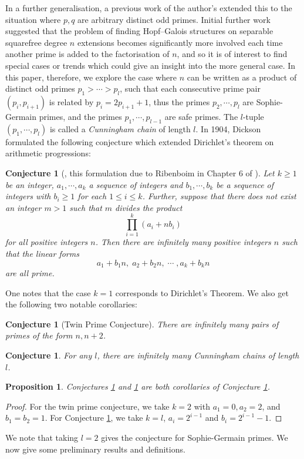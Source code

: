 \documentclass[a4paper,reqno]{amsart}
\newtheorem{proposition}[theorem]{Proposition}
\newtheorem{conjecture}[theorem]{Conjecture}
\theoremstyle{definition}
\begin{document}
In a further generalisation, a previous work of the author's \cite{Dar24(a)} extended this to the situation where $p,q$ are arbitrary distinct odd primes. Initial further work suggested that the problem of finding Hopf--Galois structures on separable squarefree degree $n$ extensions becomes significantly more involved each time another prime is added to the factorisation of $n$, and so it is of interest to find special cases or trends which could give an insight into the more general case. In this paper, therefore, we explore the case where $n$ can be written as a product of distinct odd primes $p_1>\cdots>p_l$, such that each consecutive prime pair $(p_i,p_{i+1})$ is related by $p_i=2p_{i+1}+1$, thus the primes $p_2,\cdots,p_l$ are Sophie-Germain primes, and the primes $p_1,\cdots,p_{l-1}$ are safe primes. The $l$-tuple $(p_1,\cdots,p_l)$ is called a \emph{Cunningham chain} of length $l$. In 1904, Dickson formulated the following conjecture which extended Dirichlet's theorem on arithmetic progressions:
\begin{conjecture}[\cite{Dic04}, this formulation due to Ribenboim in Chapter 6 of \cite{Rib96}]\label{Dickson}
    Let $k\geq 1$ be an integer, $a_1,\cdots,a_k$ a sequence of integers and $b_1,\cdots,b_k$ be a sequence of integers with $b_i \geq 1$ for each $1 \leq i \leq k$. Further, suppose that there does not exist an integer $m>1$ such that $m$ divides the product
    \[\prod_{i=1}^k(a_i+nb_i)\]
    for all positive integers $n$. Then there are infinitely many positive integers $n$ such that the linear forms
    \[a_1+b_1n, \; a_2+b_2n, \; \cdots \;, a_k+b_kn\]
    are all prime.
\end{conjecture}
One notes that the case $k=1$ corresponds to Dirichlet's Theorem. We also get the following two notable corollaries:
\begin{conjecture}[Twin Prime Conjecture]\label{twin_prime}
    There are infinitely many pairs of primes of the form $n,n+2$.
\end{conjecture}
\begin{conjecture}\label{cunningham}
    For any $l$, there are infinitely many Cunningham chains of length $l$.
\end{conjecture}
\begin{proposition}
    Conjectures \ref{twin_prime} and \ref{cunningham} are both corollaries of Conjecture \ref{Dickson}.
\end{proposition}
\begin{proof}
    For the twin prime conjecture, we take $k=2$ with $a_1=0, a_2=2$, and $b_1=b_2=1$. For Conjecture \ref{cunningham}, we take $k=l$, $a_i=2^{i-1}$ and $b_i=2^{i-1}-1$.
\end{proof}
We note that taking $l=2$ gives the conjecture for Sophie-Germain primes. We now give some preliminary results and definitions.
\end{document}
